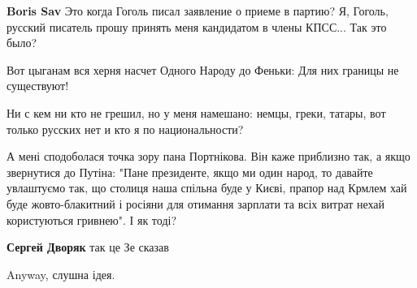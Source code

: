 \begin{itemize}
\begin{itemize}
\textbf{Boris Sav} Это когда Гоголь писал заявление о приеме в партию?
Я, Гоголь, русский писатель прошу принять меня кандидатом в члены КПСС...
Так это было?
\end{itemize}

 
Вот цыганам вся херня насчет Одного Народу до Феньки: Для них границы не существуют! 🤣

 
Ни с кем ни кто не грешил, но у меня намешано: немцы, греки, татары, вот только русских нет и кто я по национальности?

 

А мені сподоболася точка зору пана Портнікова. Він каже приблизно так, а якщо
звернутися до Путіна: "Пане президенте, якщо ми один народ, то давайте
увлаштуємо так, що столиця наша спільна буде у Києві, прапор над Крмлем хай
буде жовто-блакитний і росіяни для отимання зарплати та всіх витрат нехай
користуються гривнею". І як тоді?

\begin{itemize}
 
\textbf{Сергей Дворяк} так це Зе сказав

 
Anyway, слушна ідея.


\end{itemize}
\end{itemize}
